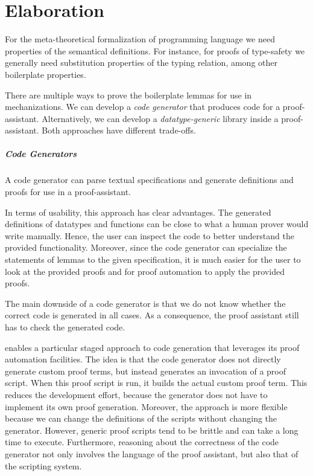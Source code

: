 \chapter{Elaboration}\label{ch:elaboration}
For the meta-theoretical formalization of programming language we need
properties of the semantical definitions. For instance, for proofs of
type-safety we generally need substitution properties of the typing relation,
among other boilerplate properties.

There are multiple ways to prove the boilerplate lemmas for use in
mechanizations. We can develop a \emph{code generator} that produces code for a
proof-assistant.  Alternatively, we can develop a \emph{datatype-generic}
library inside a proof-assistant. Both approaches have different trade-offs.


\paragraph{Code Generators}
A code generator can parse textual \Knot specifications and generate
definitions and proofs for use in a proof-assistant. 

In terms of usability, this approach has clear advantages. The generated
definitions of datatypes and functions can be close to what a human prover would
write manually. Hence, the user can inspect the code to better understand the
provided functionality. Moreover, since the code generator can specialize the
statements of lemmas to the given specification, it is much easier for the user
to look at the provided proofs and for proof automation to apply the provided
proofs.

The main downside of a code generator is that we do not know whether the
correct code is generated in all cases. As a consequence, the proof assistant
still has to check the generated code. 

\Coq enables a particular staged approach to code generation that leverages its
proof automation facilities. The idea is that the code generator does not directly
generate custom proof terms, but instead generates an invocation of a \Coq proof
script. When this proof script is run, it builds the actual custom proof term.
This reduces the development effort, because the generator does not have to
implement its own proof generation. Moreover, the approach is more flexible
because we can change the definitions of the scripts without changing the
generator.
However, generic proof scripts tend to be brittle and can take a
long time to execute. Furthermore, reasoning about the correctness of the code
generator not only involves the language of the proof assistant, but also that
of the scripting system.


